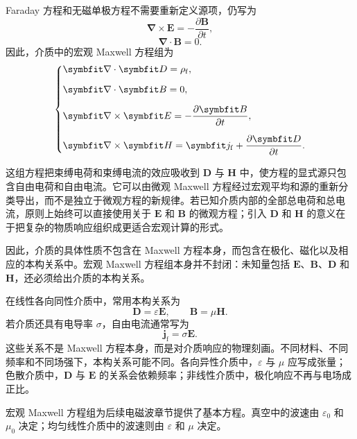 Faraday 方程和无磁单极方程不需要重新定义源项，仍写为
\begin{equation}
	\bm{\nabla}\times\bm{E}
	=
	-\frac{\partial\bm{B}}{\partial t},
	\label{eq:12:macroscopic-faraday}
\end{equation}
\begin{equation}
	\bm{\nabla}\cdot\bm{B}
	=
	0.
	\label{eq:12:macroscopic-gauss-b}
\end{equation}
因此，介质中的宏观 Maxwell 方程组为
\begin{equation}
	\begin{dcases}
		\bm{\nabla}\cdot\bm{D}=\rho_{\mathrm{f}}, \\[6pt]
		\bm{\nabla}\cdot\bm{B}=0, \\[6pt]
		\bm{\nabla}\times\bm{E}=-\frac{\partial\bm{B}}{\partial t}, \\[6pt]
		\bm{\nabla}\times\bm{H}=\bm{j}_{\mathrm{f}}+\frac{\partial\bm{D}}{\partial t}.
	\end{dcases}
	\label{eq:maxwell-matter}
\end{equation}

这组方程把束缚电荷和束缚电流的效应吸收到 $\bm{D}$ 与 $\bm{H}$ 中，使方程的显式源只包含自由电荷和自由电流。它可以由微观 Maxwell 方程经过宏观平均和源的重新分类导出，而不是独立于微观方程的新规律。若已知介质内部的全部总电荷和总电流，原则上始终可以直接使用关于 $\bm{E}$ 和 $\bm{B}$ 的微观方程；引入 $\bm{D}$ 和 $\bm{H}$ 的意义在于把复杂的物质响应组织成更适合宏观计算的形式。

因此，介质的具体性质不包含在 Maxwell 方程本身，而包含在极化、磁化以及相应的本构关系中。宏观 Maxwell 方程组本身并不封闭：未知量包括 $\bm{E}$、$\bm{B}$、$\bm{D}$ 和 $\bm{H}$，还必须给出介质的本构关系。

在线性各向同性介质中，常用本构关系为
\begin{equation}
	\bm{D}
	=
	\varepsilon\bm{E},
	\qquad
	\bm{B}
	=
	\mu\bm{H}.
	\label{eq:12:linear-medium-constitutive}
\end{equation}
若介质还具有电导率 $\sigma$，自由电流通常写为
\begin{equation}
	\bm{j}_{\mathrm{f}}
	=
	\sigma\bm{E}.
	\label{eq:12:ohm-law-local}
\end{equation}
这些关系不是 Maxwell 方程本身，而是对介质响应的物理刻画。不同材料、不同频率和不同场强下，本构关系可能不同。各向异性介质中，$\varepsilon$ 与 $\mu$ 应写成张量；色散介质中，$\bm{D}$ 与 $\bm{E}$ 的关系会依赖频率；非线性介质中，极化响应不再与电场成正比。

宏观 Maxwell 方程组为后续电磁波章节提供了基本方程。真空中的波速由 $\varepsilon_{0}$ 和 $\mu_{0}$ 决定；均匀线性介质中的波速则由 $\varepsilon$ 和 $\mu$ 决定。

